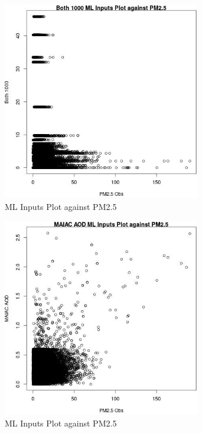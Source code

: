 \begin{figure} 
\centering  
\includegraphics[width=0.77\textwidth]{Code_Outputs/Report_ML_input_PM25_Step4_part_e_de_duplicated_aves_Both_1000vPM25_Obs.jpg} 
\caption{\label{fig:Report_ML_input_PM25_Step4_part_e_de_duplicated_avesBoth_1000vPM25_Obs}ML Inputs Plot against PM2.5} 
\end{figure} 
 

\begin{figure} 
\centering  
\includegraphics[width=0.77\textwidth]{Code_Outputs/Report_ML_input_PM25_Step4_part_e_de_duplicated_aves_MAIAC_AODvPM25_Obs.jpg} 
\caption{\label{fig:Report_ML_input_PM25_Step4_part_e_de_duplicated_avesMAIAC_AODvPM25_Obs}ML Inputs Plot against PM2.5} 
\end{figure} 
 

